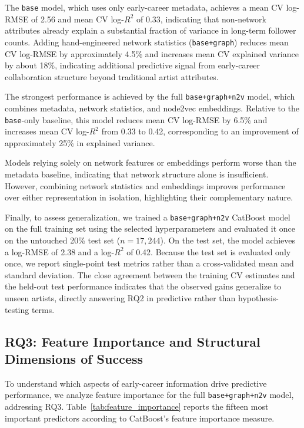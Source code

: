 \documentclass[fleqn,10pt]{wlscirep}
\begin{document}
The \texttt{base} model, which uses only early-career metadata, achieves a mean CV log-RMSE of 2.56 and mean CV log-$R^2$ of 0.33, indicating that non-network attributes already explain a substantial fraction of variance in long-term follower counts. Adding hand-engineered network statistics (\texttt{base+graph}) reduces mean CV log-RMSE by approximately 4.5\% and increases mean CV explained variance by about 18\%, indicating additional predictive signal from early-career collaboration structure beyond traditional artist attributes.

The strongest performance is achieved by the full \texttt{base+graph+n2v} model, which combines metadata, network statistics, and node2vec embeddings. Relative to the \texttt{base}-only baseline, this model reduces mean CV log-RMSE by 6.5\% and increases mean CV log-$R^2$ from 0.33 to 0.42, corresponding to an improvement of approximately 25\% in explained variance.

Models relying solely on network features or embeddings perform worse than the metadata baseline, indicating that network structure alone is insufficient. However, combining network statistics and embeddings improves performance over either representation in isolation, highlighting their complementary nature.

Finally, to assess generalization, we trained a \texttt{base+graph+n2v} CatBoost model on the full training set using the selected hyperparameters and evaluated it once on the untouched 20\% test set ($n=17{,}244$). On the test set, the model achieves a log-RMSE of 2.38 and a log-$R^2$ of 0.42. Because the test set is evaluated only once, we report single-point test metrics rather than a cross-validated mean and standard deviation. The close agreement between the training CV estimates and the held-out test performance indicates that the observed gains generalize to unseen artists, directly answering RQ2 in predictive rather than hypothesis-testing terms.


\subsection*{RQ3: Feature Importance and Structural Dimensions of Success}

To understand which aspects of early-career information drive predictive performance, we analyze feature importance for the full \texttt{base+graph+n2v} model, addressing RQ3. Table~\ref{tab:feature_importance} reports the fifteen most important predictors according to CatBoost's feature importance measure.
\end{document}
